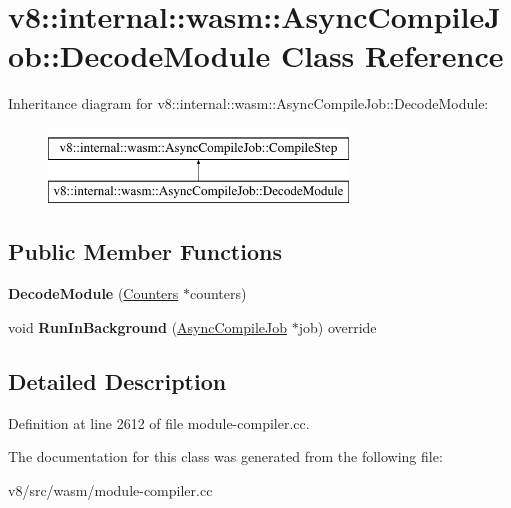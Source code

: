\hypertarget{classv8_1_1internal_1_1wasm_1_1AsyncCompileJob_1_1DecodeModule}{}\section{v8\+:\+:internal\+:\+:wasm\+:\+:Async\+Compile\+Job\+:\+:Decode\+Module Class Reference}
\label{classv8_1_1internal_1_1wasm_1_1AsyncCompileJob_1_1DecodeModule}
Inheritance diagram for v8\+:\+:internal\+:\+:wasm\+:\+:Async\+Compile\+Job\+:\+:Decode\+Module\+:\begin{figure}[H]
\begin{center}
\leavevmode
\includegraphics[height=2.000000cm]{classv8_1_1internal_1_1wasm_1_1AsyncCompileJob_1_1DecodeModule}
\end{center}
\end{figure}
\subsection*{Public Member Functions}
\begin{DoxyCompactItemize}
\item 
\mbox{\label{classv8_1_1internal_1_1wasm_1_1AsyncCompileJob_1_1DecodeModule_af37f1de9ed79c6439c155b76ebbb758b}} 
{\bfseries Decode\+Module} (\mbox{\hyperlink{classv8_1_1internal_1_1Counters}{Counters}} $\ast$counters)
\item 
\mbox{\label{classv8_1_1internal_1_1wasm_1_1AsyncCompileJob_1_1DecodeModule_a2bce50c3ea578bc818214bba82cbb656}} 
void {\bfseries Run\+In\+Background} (\mbox{\hyperlink{classv8_1_1internal_1_1wasm_1_1AsyncCompileJob}{Async\+Compile\+Job}} $\ast$job) override
\end{DoxyCompactItemize}


\subsection{Detailed Description}


Definition at line 2612 of file module-\/compiler.\+cc.



The documentation for this class was generated from the following file\+:\begin{DoxyCompactItemize}
\item 
v8/src/wasm/module-\/compiler.\+cc\end{DoxyCompactItemize}
